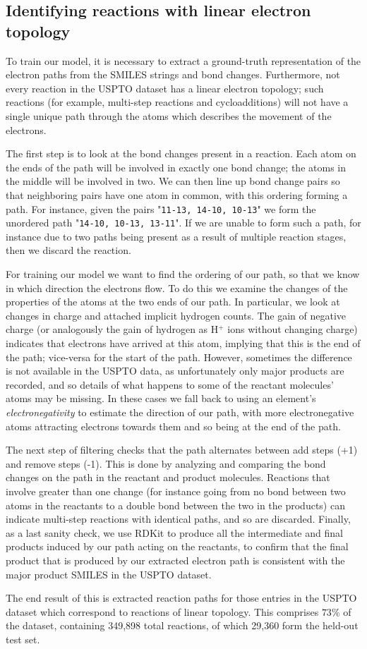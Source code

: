 \subsection{Identifying reactions with linear electron topology}

To train our model, it is necessary to extract a ground-truth representation of the electron paths from the SMILES strings and bond changes.
Furthermore, not every reaction in the USPTO dataset has a linear electron topology; 
such reactions (for example, multi-step reactions and cycloadditions) will not have a single unique path through the atoms 
which describes the movement of the electrons.

The first step is to look at the bond changes present in a reaction. 
Each atom on the ends of the path will be involved in exactly one bond change;
the atoms in the middle will be involved in two. 
We can then line up bond change pairs so that neighboring pairs have one atom in common,
 with this ordering forming a path.
For instance, given the pairs "\texttt{11-13, 14-10, 10-13}" we form the unordered path "\texttt{14-10, 10-13, 13-11}".
If we are unable to form such a path, for instance due to two paths being present as a result of multiple reaction stages, then we discard the reaction.

For training our model we want to find the ordering of our path, so that we know in which direction the electrons flow.
To do this we examine the changes of the properties of the atoms at the two ends of our path. 
In particular, we look at changes in charge and attached implicit hydrogen counts. 
The gain of negative charge (or analogously the gain of hydrogen as H$^+$ ions without changing charge) indicates that electrons have arrived at this atom, 
implying that this is the end of the path; 
vice-versa for the start of the path.
However, sometimes the difference is not available in the USPTO data, as unfortunately only major products are recorded, and so details of what happens to some of the reactant molecules' atoms may be missing.
In these cases we fall back to using an element's {\em electronegativity} to estimate the direction of our path, with more electronegative atoms attracting electrons towards them and so being at the end of the path. 

The next step of filtering checks that the path alternates between add steps (+1) and remove steps (-1). 
This is done by analyzing and comparing the bond changes on the path in the reactant and product molecules. 
Reactions that involve greater than one change (for instance going from no bond between two atoms in the reactants to a double bond between the two in the products) can indicate multi-step 
reactions with identical paths, and so are discarded.
Finally, as a last sanity check, we use RDKit to produce all the intermediate and final products induced by our path acting on the reactants,
to confirm that the final product that is produced by our extracted electron path is consistent with the major product SMILES in the USPTO dataset.

The end result of this is extracted reaction paths for those entries in the USPTO dataset which 
correspond to reactions of linear topology.
This comprises $73\%$ of the dataset, containing 349,898 total reactions, of which 29,360 form the held-out test set.


